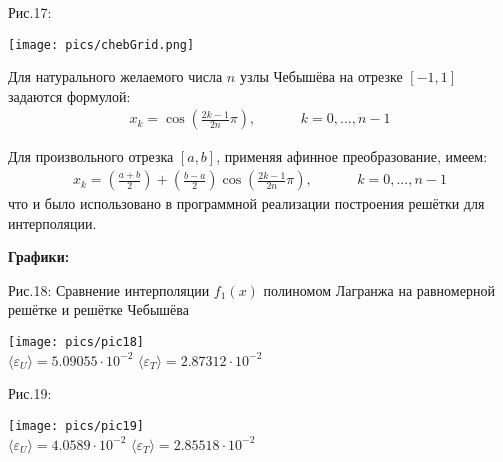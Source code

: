 \documentclass[a4paper, 14pt]{article}
\begin{document}
{{\normalsize Рис.17:}
\begin{center}
    \texttt{[image: pics/chebGrid.png]}
\end{center}

Для натурального желаемого числа $n$ узлы Чебышёва на отрезке $[-1, 1]$ задаются формулой:
\begin{align}
     x_k = \cos\left(\frac{2k - 1}{2n}\pi\right), &\hspace{1cm} k=0,...,n-1
\end{align}

Для произвольного отрезка $[a, b]$, применяя афинное преобразование, имеем:
\begin{align}
    x_k = \left(\frac{a+b}{2}\right) + \left(\frac{b-a}{2}\right) \cos\left(\frac{2k-1}{2n}\pi\right), &\hspace{1cm} k=0,...,n-1
\end{align}
что и было использовано в программной реализации построения решётки для интерполяции.


\newpage
{\huge{\bf{Графики:}}}

\vspace{-0.5cm}
{\normalsize Рис.18: Сравнение интерполяции $f_1(x)$ полиномом Лагранжа на равномерной решётке и решётке Чебышёва}
\begin{center}
    \texttt{[image: pics/pic18]}\\
    \vspace{-0.7cm}
    {\small
        $\langle\varepsilon_U\rangle=5.09055\cdot10^{-2}$ \hspace{3cm}
        $\langle\varepsilon_T\rangle=2.87312\cdot10^{-2}$
    }
\end{center}
{\normalsize Рис.19:}
\begin{center}
    \texttt{[image: pics/pic19]}\\
    \vspace{-0.7cm}
    {\small
        $\langle\varepsilon_U\rangle=4.0589\cdot10^{-2}$ \hspace{3cm}
        $\langle\varepsilon_T\rangle=2.85518\cdot10^{-2}$
    }
\end{center}


}
\end{document}
